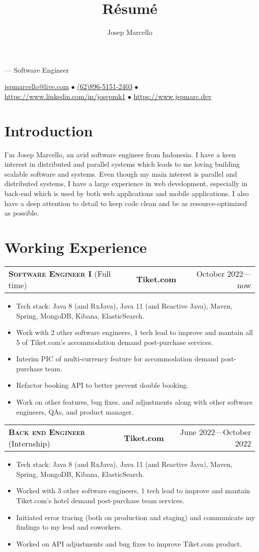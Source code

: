 \documentclass[10pt]{article}
\makeatletter
\renewcommand{\maketitle}{
    \rmfamily
    \noindent
    {\Huge \theauthor} ---
    \sffamily
    Software Engineer

    \vspace{0.1em}
    \noindent
    \href{mailto:jspmarcello@live.com}{jspmarcello@live.com} $\bullet$
    \href{https://wa.me/6289651512403}{(62)896-5151-2403} $\bullet$
    \href{https://www.linkedin.com/in/josepmk1}{https://www.linkedin.com/in/josepmk1} $\bullet$
    \href{https://www.jspmarc.dev}{https://www.jspmarc.dev}
}
\newcommand{\workExpVspace}{1em}
\newcommand{\workExp}[6]{
    \noindent \begin{tabularx}{\textwidth}{@{}X c|r}
        \textbf{\textsc{#5}} (#2) & \textbf{#1} & #3---#4
    \end{tabularx}

    {#6}
    \vspace{\workExpVspace}
}
\makeatother
\begin{document}
\title{R\'esum\'e}
\author{Josep Marcello}

\maketitle

\section{Introduction}

I'm Josep Marcello, an avid software engineer from Indonesia. I have a keen interest in distributed
and parallel systems which leads to me loving building scalable software and systems. Even though 
my main interest is parallel and distributed systems, I have a large experience in web development,
especially in back-end which is used by both web applications and mobile applications. I also have
a deep attention to detail to keep code clean and be as resource-optimized as possible.

\section{Working Experience}

\workExp
    {Tiket.com}
    {Full time}
    {October 2022}
    {now}
    {Software Engineer I}
    {
        \begin{itemize}
            \item Tech stack: Java 8 (and RxJava), Java 11 (and Reactive Java), Maven, Spring,
                MongoDB, Kibana, ElasticSearch.
            \item Work with 2 other software engineers, 1 tech lead to improve and mantain
                all 5 of Tiket.com's accommodation demand post-purchase services.
            \item Interim PIC of multi-currency feature for accommodation demand post-purchase
                team.
            \item Refactor booking API to better prevent double booking.
            \item Work on other features, bug fixes, and adjustments along with other software engineers,
                QAs, and product manager.
        \end{itemize}
    }

\workExp
    {Tiket.com}
    {Internship}
    {June 2022}
    {October 2022}
    {Back end Engineer}
    {
        \begin{itemize}
            \item Tech stack: Java 8 (and RxJava), Java 11 (and Reactive Java), Maven, Spring,
                MongoDB, Kibana, ElasticSearch.
            \item Worked with 3 other software engineers, 1 tech lead to improve and mantain
                Tiket.com's hotel demand post-purchase team services.
            \item Initiated error tracing (both on production and staging) and communicate my
                findings to my lead and coworkers.
            \item Worked on API adjustments and bug fixes to improve Tiket.com product.
        \end{itemize}
    }
\end{document}
